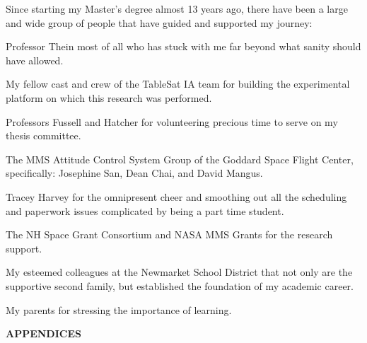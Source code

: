 \documentclass[11pt,doublespace]{unhthesis}
\begin{document}
\begin{acknowledgments}
Since starting my Master's degree almost 13 years ago, there have been a large and wide group of people that have guided and supported my journey:

Professor Thein most of all who has stuck with me far beyond what sanity should have allowed.

My fellow cast and crew of the TableSat IA team for building the experimental platform on which this research was performed.

Professors Fussell and Hatcher for volunteering precious time to serve on my thesis committee.

The MMS Attitude Control System Group of the Goddard Space Flight Center, specifically: Josephine San, Dean Chai, and David Mangus.

Tracey Harvey for the omnipresent cheer and smoothing out all the scheduling and paperwork issues complicated by being a part time student.

The NH Space Grant Consortium and NASA MMS Grants for the research support.

My esteemed colleagues at the Newmarket School District that not only are the supportive second family, but established the foundation of my academic career.

My parents for stressing the importance of learning.
\end{acknowledgments}

\begin{singlespace}
  \tableofcontents
  \listoftables
  \listoffigures
\end{singlespace}

\begin{abstractpage}
\end{abstractpage}

















\newpage
\vspace*{100mm}
\begin{center}
  {\huge \bf APPENDICES}
\end{center}
\end{document}
